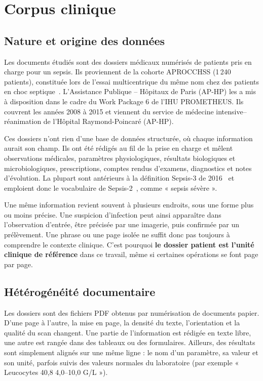 \section{Corpus clinique}\label{sec:c3-3-2}

\subsection{Nature et origine des données}\label{sec:c3-3-2-1}

Les documents étudiés sont des dossiers médicaux numérisés de patients pris en charge pour un sepsis. Ils proviennent de la cohorte APROCCHSS (1\,240 patients), constituée lors de l’essai multicentrique du même nom chez des patients en choc septique~\cite{annane2018aprocchss}. L’Assistance Publique -- Hôpitaux de Paris (AP-HP) les a mis à disposition dans le cadre du Work Package 6 de l’IHU PROMETHEUS. Ils couvrent les années 2008 à 2015 et viennent du service de médecine intensive--réanimation de l’Hôpital Raymond-Poincaré (AP-HP).

Ces dossiers n’ont rien d’une base de données structurée, où chaque information aurait son champ. Ils ont été rédigés au fil de la prise en charge et mêlent observations médicales, paramètres physiologiques, résultats biologiques et microbiologiques, prescriptions, comptes rendus d’examens, diagnostics et notes d’évolution. La plupart sont antérieurs à la définition Sepsis-3 de 2016~\cite{singer2016third} et emploient donc le vocabulaire de Sepsis-2~\cite{levy2003sccm}, comme « sepsis sévère ».

Une même information revient souvent à plusieurs endroits, sous une forme plus ou moins précise. Une suspicion d’infection peut ainsi apparaître dans l’observation d’entrée, être précisée par une imagerie, puis confirmée par un prélèvement. Une phrase ou une page isolée ne suffit donc pas toujours à comprendre le contexte clinique. C’est pourquoi \textbf{le dossier patient est l’unité clinique de référence} dans ce travail, même si certaines opérations se font page par page.

\subsection{Hétérogénéité documentaire}\label{sec:c3-3-2-2}

Les dossiers sont des fichiers PDF obtenus par numérisation de documents papier. D’une page à l’autre, la mise en page, la densité du texte, l’orientation et la qualité du scan changent. Une partie de l’information est rédigée en texte libre, une autre est rangée dans des tableaux ou des formulaires. Ailleurs, des résultats sont simplement alignés sur une même ligne : le nom d’un paramètre, sa valeur et son unité, parfois suivis des valeurs normales du laboratoire (par exemple « Leucocytes 40,8 4,0--10,0 G/L »).

